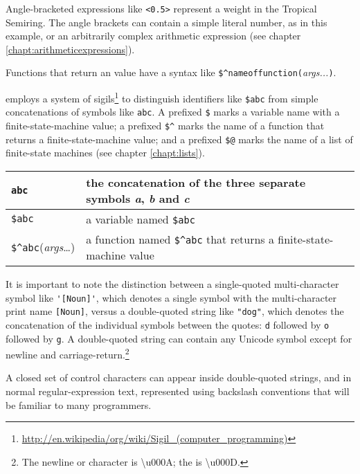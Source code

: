 Angle-bracketed expressions like \texttt{<0.5>} represent a weight in the Tropical
Semiring.  The angle brackets can contain a simple literal number, as in this example,
or an arbitrarily complex arithmetic expression (see chapter
\ref{chapt:arithmeticexpressions}).

Functions that return an \fsm{} value have a syntax like
\texttt{\$\^{}nameoffunction(}\emph{args...}\texttt{)}.

\Kleene{} employs a system of
sigils\footnote{\url{http://en.wikipedia/org/wiki/Sigil_(computer_programming)}}
to distinguish identifiers like \verb!$abc! from simple concatenations of symbols 
like \verb!abc!.  A prefixed
\verb!$! marks a variable name with a finite-state-machine value; a prefixed
\verb!$^! marks the
name of a function that returns a finite-state-machine value; and a prefixed \verb!$@! marks the name of
a list of finite-state machines (see chapter \ref{chapt:lists}).

\vspace{0.5cm} 

\begin{center}
\begin{tabular}{|l|p{8cm}|}
\hline
\verb!abc! & the concatenation of the three separate symbols \emph{a}, \emph{b} and \emph{c} \\
\hline
\verb!$abc! & a variable named \verb!$abc! \\
\hline
\verb!$^abc!(\textit{args}\ldots{}) & a function named
\verb!$^abc! that returns a finite-state-machine value\\
\hline
\end{tabular}
\end{center}

\vspace{0.5cm}

It is important to note the distinction between a single-quoted
multi-character symbol like \verb!'[Noun]'!, which denotes a single
symbol with the multi-character print name \verb![Noun]!, versus a
double-quoted string like \verb!"dog"!, which denotes the concatenation of
the individual symbols between the quotes: \texttt{d} followed by \texttt{o} followed by
\texttt{g}.  A double-quoted string can
contain any Unicode  symbol except for newline and
carriage-return.\footnote{The newline or  character is
\textbackslash{}u000A; the  is
\textbackslash{}u000D.}

A closed set of control characters can appear inside double-quoted strings,
and in normal regular-expression text,
represented using backslash conventions that will be familiar to many
programmers.

